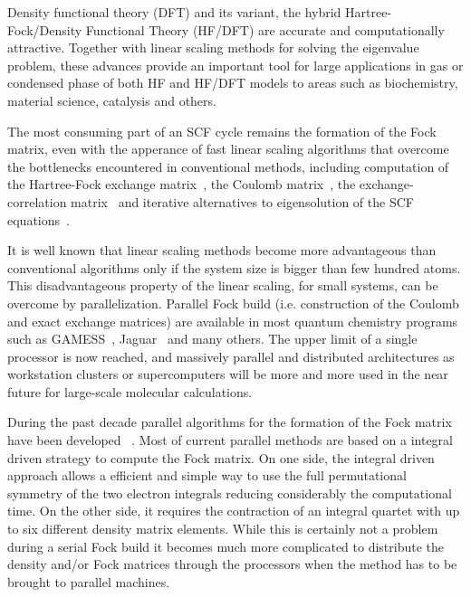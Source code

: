 \documentclass[prl,twocolumn,showpacs,twocolumngrid,superbib]{revtex4}
\begin{document}
 Density functional theory (DFT) and its variant, 
 the hybrid Hartree-Fock/Density Functional Theory (HF/DFT) are accurate and
 computationally attractive. Together with linear scaling methods 
 for solving the eigenvalue problem, these
 advances provide an important tool for large applications in gas or condensed phase 
 of both HF and HF/DFT models to areas such as biochemistry, material science, catalysis and others.


 The most consuming part of an SCF cycle remains the formation
 of the Fock matrix, even with the apperance of fast linear
 scaling algorithms 
 that overcome the bottlenecks encountered in conventional methods,
 including computation of the Hartree-Fock exchange 
 matrix~\cite{ESchwegler96,ESchwegler97,ESchwegler98A,ESchwegler99,ESchwegler00,CTymczak04b},
 the Coulomb 
 matrix~\cite{CWhite94B,CWhite96A,MChallacombe96,MChallacombe96B,MStrain96,
              JPerezjorda97,MChallacombe97,CTymczak04a}, 
 the exchange-correlation 
 matrix~\cite{CTymczak04a,Jorda95,RStratmann96,CGuerra98,MChallacombe00A}
 and iterative alternatives to eigensolution of the SCF 
 equations~\cite{XLi93,MDaw93,ADaniels97,APalser98,
                 MChallacombe99,ANiklasson02A,ANiklasson03}.

 It is well known that linear scaling 
 methods become more advantageous than conventional  
 algorithms only if the system size is bigger than
 few hundred atoms. This disadvantageous property of the linear
 scaling, for small systems, can be overcome by 
 parallelization. 
 Parallel Fock build (i.e. construction of the Coulomb and exact exchange matrices)
 are available in most quantum
 chemistry programs such as GAMESS~\cite{GAMESS},
 Jaguar~\cite{DChasman98} and many others. 
 The upper limit of a single processor
 is now reached, and massively parallel and distributed
 architectures as workstation clusters or supercomputers will be 
 more and more used in the near future for large-scale 
 molecular calculations.


 During the past decade parallel algorithms for the 
 formation of the Fock matrix have been developed
 ~\cite{MColvin93,TFurlani95,RHarrison96,YAlexeev02,HTakashima02,RLindh03}.
 Most of current parallel methods are based on a integral driven strategy
 to compute the Fock matrix. On one side, the integral driven approach
 allows a efficient and simple way to use the full permutational symmetry
 of the two electron integrals reducing considerably the computational time. 
 On the other side, it requires the contraction of an integral quartet with up to six 
 different density matrix elements.
 While this is certainly not a problem during a serial Fock build it becomes
 much more complicated to distribute the density and/or Fock matrices through the 
 processors when the method has to be brought to parallel machines.
\end{document}
